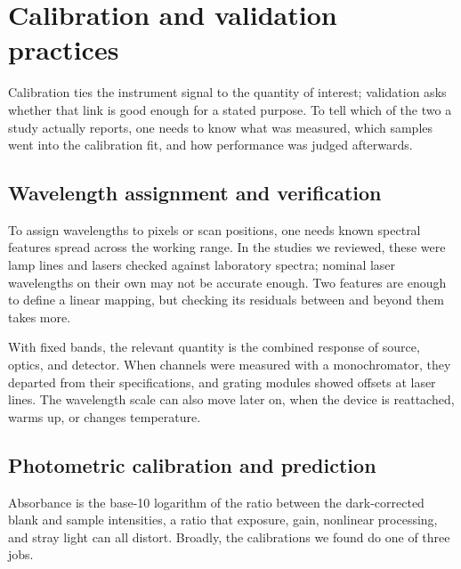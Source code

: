 \section{Calibration and validation practices}\label{sec:validation}

Calibration ties the instrument signal to the quantity of interest; validation asks whether that link is good enough for a stated purpose.\citep{jcgm2012vim,eurachem2014fitness} To tell which of the two a study actually reports, one needs to know what was measured, which samples went into the calibration fit, and how performance was judged afterwards.

\subsection{Wavelength assignment and verification}

To assign wavelengths to pixels or scan positions, one needs known spectral features spread across the working range. In the studies we reviewed, these were lamp lines and lasers checked against laboratory spectra;\citep{long2014smartphone,woodburn2019analysis} nominal laser wavelengths on their own may not be accurate enough.\citep{vidal2021use} Two features are enough to define a linear mapping, but checking its residuals between and beyond them takes more.

With fixed bands, the relevant quantity is the combined response of source, optics, and detector. When channels were measured with a monochromator, they departed from their specifications,\citep{dolgalev2025development,besozzi2026flexible} and grating modules showed offsets at laser lines.\citep{hotra2022investigation,firago2022diffuse} The wavelength scale can also move later on, when the device is reattached, warms up, or changes temperature.\citep{zhang2016g,markvart2020continuous,wilkes2019pispec}

\subsection{Photometric calibration and prediction}

Absorbance is the base-10 logarithm of the ratio between the dark-corrected blank and sample intensities, a ratio that exposure, gain, nonlinear processing, and stray light can all distort.\citep{feng2021open,tonelli2021sensing,nguyen2025portable} Broadly, the calibrations we found do one of three jobs.

